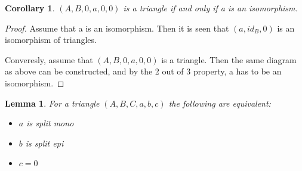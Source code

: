 \documentclass[12pt]{article}
\newtheorem{corollary}{Corollary}[theorem]
\newtheorem{lemma}[theorem]{Lemma}
\theoremstyle{definition}
\theoremstyle{remark}
\begin{document}
            \begin{corollary}
                $(A,B,0,a,0,0)$ is a triangle if and only if a is an isomorphism.
            \end{corollary}

            \begin{proof}
                Assume that a is an isomorphism. Then it is seen that $(a,id_B,0)$ is an isomorphism of triangles.
                \begin{center}
                \end{center}
                Converesly, assume that $(A,B,0,a,0,0)$ is a triangle. Then the same diagram as above can be constructed, and by the 2 out of 3 property, a has to be an isomorphism.
            \end{proof}

            \begin{lemma}
                For a triangle $(A,B,C,a,b,c)$ the following are equivalent:

                \begin{center}
                    \begin{minipage}[c]{0.3\textwidth}
                    \end{minipage}
                    \begin{minipage}[c]{0.3\textwidth}
                        \begin{itemize}
                            \item $a$ is split mono
                            \item $b$ is split epi
                            \item $c = 0$
                        \end{itemize}
                    \end{minipage}
                \end{center}
            \end{lemma}
\end{document}
